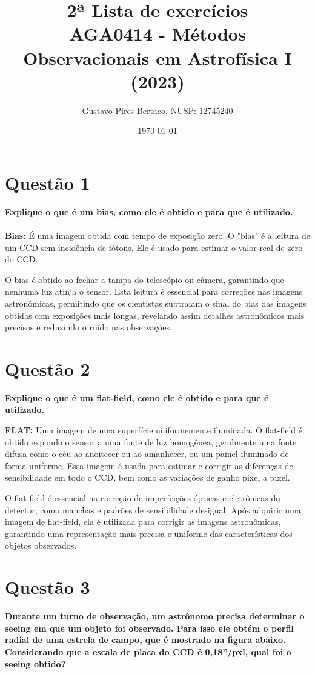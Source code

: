 \documentclass[a4paper, 12pt]{article}
\title{ \textbf{2ª Lista de exercícios} \\ AGA0414 - Métodos Observacionais em Astrofísica I (2023)}
\author{Gustavo Pires Bertaco, NUSP: 12745240}
\date{\today}
\begin{document}
\maketitle
\section*{\large Questão 1}
\noindent \textbf{Explique o que é um bias, como ele é obtido e para que é utilizado.} \\
\\ 
\textbf{Bias:} É uma imagem obtida com tempo de exposição zero. O "bias" é a leitura de um CCD sem incidência de fótons. Ele é usado para estimar o valor real de zero do CCD.

O bias é obtido ao fechar a tampa do telescópio ou câmera, garantindo que nenhuma luz atinja o sensor. Esta leitura é essencial para correções nas imagens astronômicas, permitindo que os cientistas subtraiam o sinal do bias das imagens obtidas com exposições mais longas, revelando assim detalhes astronômicos mais precisos e reduzindo o ruído nas observações.

\section*{Questão 2}
\noindent \textbf{Explique o que é um flat-field, como ele é obtido e para que é utilizado.}

\textbf{FLAT:} Uma imagem de uma superfície uniformemente iluminada. O flat-field é obtido expondo o sensor a uma fonte de luz homogênea, geralmente uma fonte difusa como o céu ao anoitecer ou ao amanhecer, ou um painel iluminado de forma uniforme. Essa imagem é usada para estimar e corrigir as diferenças de sensibilidade em todo o CCD, bem como as variações de ganho pixel a pixel.

O flat-field é essencial na correção de imperfeições ópticas e eletrônicas do detector, como manchas e padrões de sensibilidade desigual. Após adquirir uma imagem de flat-field, ela é utilizada para corrigir as imagens astronômicas, garantindo uma representação mais precisa e uniforme das características dos objetos observados.


\section*{Questão 3}
\noindent \textbf{Durante um turno de observação, um astrônomo precisa determinar o seeing em que um objeto foi observado. Para isso ele obtém o perfil radial de uma estrela de campo, que é mostrado na figura abaixo. Considerando que a escala de placa do CCD é 0,18”/pxl, qual foi o seeing obtido?} \\
\end{document}
